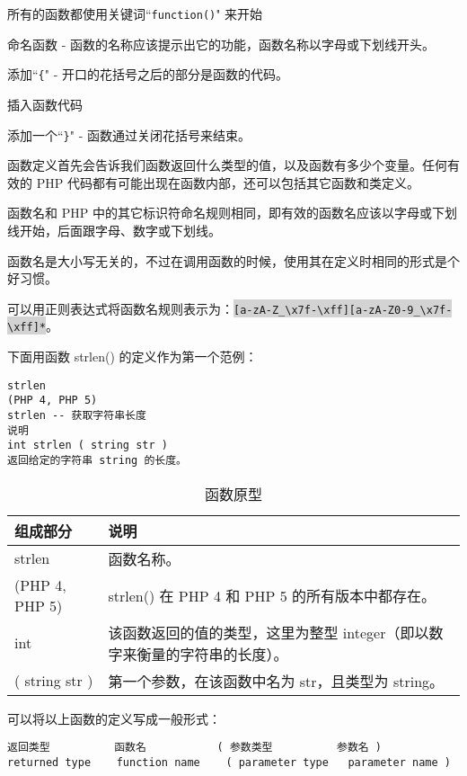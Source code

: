 \begin{compactitem}
\item 所有的函数都使用关键词``\texttt{function()}" 来开始
\item 命名函数 - 函数的名称应该提示出它的功能，函数名称以字母或下划线开头。
\item 添加``\texttt{\{}" - 开口的花括号之后的部分是函数的代码。
\item 插入函数代码
\item 添加一个``\texttt{\}}" - 函数通过关闭花括号来结束。
\end{compactitem}

函数定义首先会告诉我们函数返回什么类型的值，以及函数有多少个变量。任何有效的 PHP 代码都有可能出现在函数内部，还可以包括其它函数和类定义。


函数名和 PHP 中的其它标识符命名规则相同，即有效的函数名应该以字母或下划线开始，后面跟字母、数字或下划线。

函数名是大小写无关的，不过在调用函数的时候，使用其在定义时相同的形式是个好习惯。

可以用正则表达式将函数名规则表示为：\colorbox{lightgray}{\texttt{[a-zA-Z\_\textbackslash x7f-\textbackslash xff][a-zA-Z0-9\_\textbackslash x7f-\textbackslash xff]*}}。

下面用函数 strlen() 的定义作为第一个范例：

\begin{verbatim}
strlen
(PHP 4, PHP 5)
strlen -- 获取字符串长度
说明
int strlen ( string str )
返回给定的字符串 string 的长度。
\end{verbatim}

\begin{table}
\centering
\caption{函数原型}
\begin{tabular}{|l|l|}
\hline
组成部分	&说明\\
\hline
strlen	 &函数名称。\\
\hline
(PHP 4, PHP 5)	& strlen() 在 PHP 4 和 PHP 5 的所有版本中都存在。\\
\hline
int	 &该函数返回的值的类型，这里为整型 integer（即以数字来衡量的字符串的长度）。\\
\hline
( string str )	 &第一个参数，在该函数中名为 str，且类型为 string。\\
\hline
\end{tabular}
\end{table}

可以将以上函数的定义写成一般形式：

\begin{verbatim}
返回类型          函数名           ( 参数类型          参数名 )
returned type    function name    ( parameter type   parameter name )
\end{verbatim}

